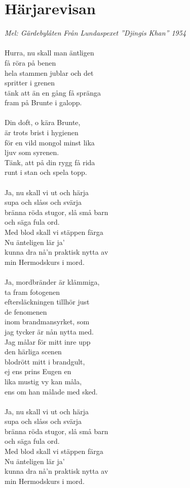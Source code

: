 \documentclass[a5paper,15pt]{article}
\begin{document}
\section{Härjarevisan}
\emph{Mel: Gärdebylåten}
\newline
\emph{Från Lundaspexet ”Djingis Khan” 1954}\\
\\
Hurra, nu skall man äntligen \\
få röra på benen\\
hela stammen jublar och det \\
spritter i grenen\\
tänk att än en gång få spränga\\
fram på Brunte i galopp.\\
\\
Din doft, o kära Brunte,\\
är trots brist i hygienen\\
för en vild mongol minst lika \\
ljuv som syrenen.\\
Tänk, att på din rygg få rida\\
runt i stan och spela topp.\\
\\
Ja, nu skall vi ut och härja\\
supa och slåss och svärja\\
bränna röda stugor, slå små barn\\
och säga fula ord.\\
Med blod skall vi stäppen färga\\
Nu änteligen lär ja’\\
kunna dra nå’n praktisk nytta av\\
min Hermodskurs i mord.\\
\\
Ja, mordbränder är klämmiga,\\
ta fram fotogenen\\
eftersläckningen tillhör just \\de fenomenen\\
inom brandmansyrket, som \\
jag tycker är nån nytta med.\\
Jag målar för mitt inre upp\\
den härliga scenen\\
blodrött mitt i brandgult,\\ 
ej ens prins Eugen en\\
lika mustig vy kan måla,\\
ens om han målade med sked.\\
\\
Ja, nu skall vi ut och härja\\
supa och slåss och svärja\\
bränna röda stugor, slå små barn\\
och säga fula ord.\\
Med blod skall vi stäppen färga\\
Nu änteligen lär ja’\\
kunna dra nå’n praktisk nytta av\\
min Hermodskurs i mord.\\
\end{document}
